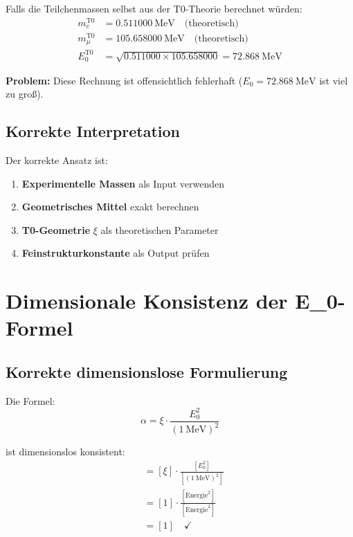 \documentclass[12pt,a4paper]{article}
\theoremstyle{definition}
\begin{document}
	Falls die Teilchenmassen selbst aus der T0-Theorie berechnet w\"urden:
	\begin{align}
		m_e^{\text{T0}} &= \SI{0.511000}{\MeV} \quad \text{(theoretisch)} \\
		m_\mu^{\text{T0}} &= \SI{105.658000}{\MeV} \quad \text{(theoretisch)} \\
		E_0^{\text{T0}} &= \sqrt{0.511000 \times 105.658000} = \SI{72.868}{\MeV}
	\end{align}
	
	\textbf{Problem:} Diese Rechnung ist offensichtlich fehlerhaft ($E_0 = \SI{72.868}{\MeV}$ ist viel zu gro\ss{}).
	
	\subsection{Korrekte Interpretation}
	
	Der korrekte Ansatz ist:
	\begin{enumerate}
		\item \textbf{Experimentelle Massen} als Input verwenden
		\item \textbf{Geometrisches Mittel} exakt berechnen  
		\item \textbf{T0-Geometrie} $\xi$ als theoretischen Parameter
		\item \textbf{Feinstrukturkonstante} als Output pr\"ufen
	\end{enumerate}
	
	\section{Dimensionale Konsistenz der E\_0-Formel}
	
	\subsection{Korrekte dimensionslose Formulierung}
	
	Die Formel:
	\begin{equation}
		\alpha = \xi \cdot \frac{E_0^2}{( \SI{1}{\MeV} )^2}
	\end{equation}
	
	ist dimensionslos konsistent:
	\begin{align}
		[\alpha] &= [\xi] \cdot \frac{[E_0^2]}{[( \SI{1}{\MeV} )^2]} \\
		&= [1] \cdot \frac{[\text{Energie}^2]}{[\text{Energie}^2]} \\
		&= [1] \quad \checkmark
	\end{align}
	
\end{document}
